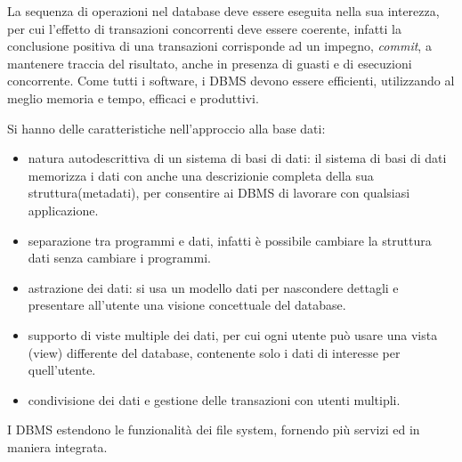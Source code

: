 \documentclass[a4paper,12pt, oneside]{book}
\begin{document}
La sequenza di operazioni nel database deve essere eseguita nella sua interezza, per cui l'effetto di 
transazioni concorrenti deve essere coerente, infatti la conclusione positiva di una transazioni corrisponde ad un impegno,
\emph{commit}, a mantenere traccia del risultato, anche in presenza di guasti e di esecuzioni concorrente.\newline
Come tutti i software, i DBMS devono essere efficienti, utilizzando al meglio memoria e tempo, efficaci e produttivi.

Si hanno delle caratteristiche nell'approccio alla base dati:
\begin{itemize}
    \item natura autodescrittiva di un sistema di basi di dati: il sistema di basi di dati memorizza i dati con
          anche una descrizionie completa della sua struttura(metadati), per consentire ai DBMS di lavorare con qualsiasi applicazione.
    \item separazione tra programmi e dati, infatti è possibile cambiare la struttura dati senza cambiare i programmi.
    \item astrazione dei dati: si usa un modello dati per nascondere dettagli e presentare
            all'utente una visione concettuale del database.
    \item supporto di viste multiple dei dati, per cui ogni utente può usare una vista (view) differente del
          database, contenente solo i dati di interesse per quell'utente.
    \item condivisione dei dati e gestione delle transazioni con utenti multipli.
\end{itemize}
I DBMS estendono le funzionalità dei file system, fornendo più servizi ed in maniera integrata.
\end{document}
